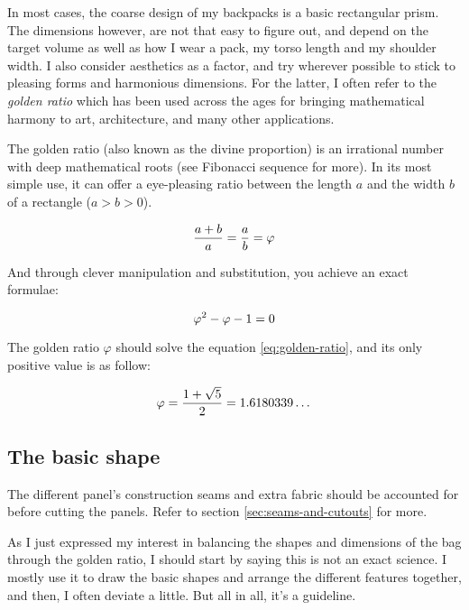 In most cases, the coarse design of my backpacks is a basic rectangular prism. The dimensions however, are not that easy to figure out, and depend on the target volume as well as how I wear a pack, my torso length and my shoulder width. I also consider aesthetics as a factor, and try wherever possible to stick to pleasing forms and harmonious dimensions. For the latter, I often refer to the \textit{golden ratio} which has been used across the ages for bringing mathematical harmony to art, architecture, and many other applications.

\begin{note}
  The golden ratio (also known as the divine proportion) is an irrational number with deep mathematical roots (see Fibonacci sequence for more). In its most simple use, it can offer a eye-pleasing ratio between the length $a$ and the width $b$ of a rectangle ($a > b > 0$).

  \begin{equation}
    \centering
    \frac{a + b}{a} = \frac{a}{b}=\varphi
  \end{equation}

  And through clever manipulation and substitution, you achieve an exact formulae:

  \begin{equation}
    \centering
    \label{eq:golden-ratio}
    \varphi^2 - \varphi - 1 = 0
  \end{equation}

  The golden ratio $\varphi$ should solve the equation \ref{eq:golden-ratio}, and its only positive value is as follow:

  \begin{equation}
    \centering
    \varphi = \frac{1 + \sqrt{5}}{2} = 1.6180339\dots
  \end{equation}

\end{note}


\subsection{The basic shape}

\begin{warning}
  The different panel's construction seams and extra fabric should be accounted for before cutting the panels. Refer to section \ref{sec:seams-and-cutouts} for more.
\end{warning}

As I just expressed my interest in balancing the shapes and dimensions of the bag through the golden ratio, I should start by saying this is not an exact science. I mostly use it to draw the basic shapes and arrange the different features together, and then, I often deviate a little. But all in all, it's a guideline.

